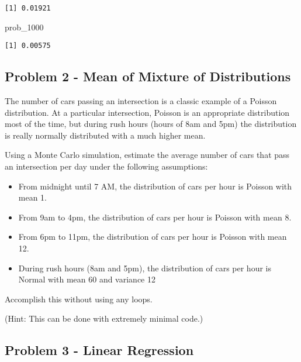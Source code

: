 \documentclass[
  letterpaper,
  DIV=11,
  numbers=noendperiod]{scrartcl}
\newenvironment{Shaded}{\begin{snugshade}}{\end{snugshade}}
\newcommand{\NormalTok}[1]{\textcolor[rgb]{0.00,0.23,0.31}{#1}}
\providecommand{\tightlist}{%
  \setlength{\itemsep}{0pt}\setlength{\parskip}{0pt}}
\begin{document}
\begin{verbatim}
[1] 0.01921
\end{verbatim}

\begin{Shaded}
\begin{Highlighting}[]
\NormalTok{prob\_1000}
\end{Highlighting}
\end{Shaded}

\begin{verbatim}
[1] 0.00575
\end{verbatim}

\subsection{Problem 2 - Mean of Mixture of
Distributions}\label{problem-2---mean-of-mixture-of-distributions}

The number of cars passing an intersection is a classic example of a
Poisson distribution. At a particular intersection, Poisson is an
appropriate distribution most of the time, but during rush hours (hours
of 8am and 5pm) the distribution is really normally distributed with a
much higher mean.

Using a Monte Carlo simulation, estimate the average number of cars that
pass an intersection per day under the following assumptions:

\begin{itemize}
\tightlist
\item
  From midnight until 7 AM, the distribution of cars per hour is Poisson
  with mean 1.\\
\item
  From 9am to 4pm, the distribution of cars per hour is Poisson with
  mean 8.\\
\item
  From 6pm to 11pm, the distribution of cars per hour is Poisson with
  mean 12.\\
\item
  During rush hours (8am and 5pm), the distribution of cars per hour is
  Normal with mean 60 and variance 12
\end{itemize}

Accomplish this without using any loops.

(Hint: This can be done with extremely minimal code.)

\subsection{Problem 3 - Linear
Regression}\label{problem-3---linear-regression}
\end{document}
